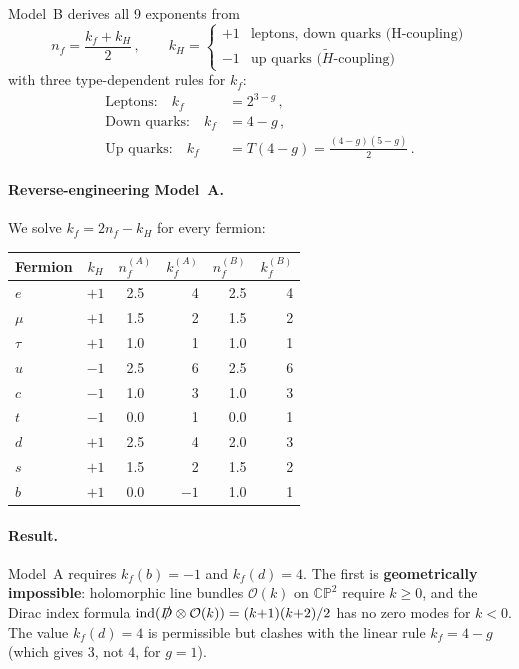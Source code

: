 \documentclass[11pt]{article}
\begin{document}
Model~B derives all 9 exponents from
\begin{equation}\label{eq:nf}
  n_f = \frac{k_f + k_H}{2}\,,
  \qquad k_H = \begin{cases} +1 & \text{leptons, down quarks (H-coupling)}\\
  -1 & \text{up quarks ($\tilde{H}$-coupling)}\end{cases}
\end{equation}
with three type-dependent rules for $k_f$:
\begin{align}
  \text{Leptons:}\quad k_f &= 2^{3-g}\,, \label{eq:lep}\\
  \text{Down quarks:}\quad k_f &= 4-g\,, \label{eq:down}\\
  \text{Up quarks:}\quad k_f &= T(4-g) = \tfrac{(4-g)(5-g)}{2}\,. \label{eq:up}
\end{align}

\paragraph{Reverse-engineering Model~A.}
We solve $k_f = 2n_f - k_H$ for every fermion:

\begin{center}
\begin{tabular}{lccrrr}
\toprule
Fermion & $k_H$ & $n_f^{(A)}$ & $k_f^{(A)}$ & $n_f^{(B)}$ & $k_f^{(B)}$ \\
\midrule
$e$   & $+1$ & 2.5 & 4  & 2.5 & 4 \\
$\mu$ & $+1$ & 1.5 & 2  & 1.5 & 2 \\
$\tau$& $+1$ & 1.0 & 1  & 1.0 & 1 \\
$u$   & $-1$ & 2.5 & 6  & 2.5 & 6 \\
$c$   & $-1$ & 1.0 & 3  & 1.0 & 3 \\
$t$   & $-1$ & 0.0 & 1  & 0.0 & 1 \\
\midrule
$d$   & $+1$ & 2.5 & \color{alert}4  & 2.0 & 3 \\
$s$   & $+1$ & 1.5 & 2  & 1.5 & 2 \\
$b$   & $+1$ & 0.0 & \color{alert}$-1$ & 1.0 & 1 \\
\bottomrule
\end{tabular}
\end{center}

\paragraph{Result.}
Model~A requires $k_f(b) = -1$ and $k_f(d) = 4$.  The first is
\textbf{geometrically impossible}: holomorphic line bundles $\mathcal{O}(k)$
on $\mathbb{CP}^2$ require $k \geq 0$, and the Dirac index formula
$\mathrm{ind}(\slashed{D}\otimes\mathcal{O}(k)) = (k{+}1)(k{+}2)/2$
has no zero modes for $k<0$.  The value $k_f(d)=4$ is permissible but
clashes with the linear rule $k_f=4-g$ (which gives 3, not 4, for $g=1$).
\end{document}
